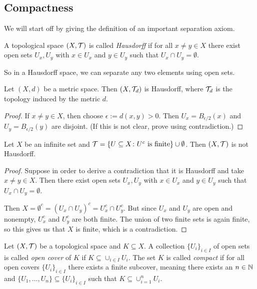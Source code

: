 \documentclass{article}
\begin{document}
\subsection{Compactness}

We will start off by giving the definition of an important separation axiom. 

\begin{definition}
A topological space $(X,\mathcal{T})$ is called \emph{Hausdorff} if for all $x\neq y\in X$ there exist open sets $U_x,U_y$ with $x\in U_x$ and $y\in U_y$ such that $U_x \cap U_y = \emptyset$.
\end{definition}

So in a Hausdorff space, we can separate any two elements using open sets.

\begin{example}
Let $(X,d)$ be a metric space. Then $(X,\mathcal{T}_d)$ is Hausdorff, where $\mathcal{T}_d$ is the topology induced by the metric $d$.
\end{example}
\begin{proof}
If $x\neq y \in X$, then choose $\epsilon:= d(x,y)>0$. Then $U_x=B_{\epsilon/2}(x)$ and $U_y=B_{\epsilon/2}(y)$ are disjoint. (If this is not clear, prove using contradiction.)
\end{proof}

\begin{example}
Let $X$ be an infinite set and $\mathcal{T} = \{U\subseteq X \colon U^c \text{ is finite} \}\cup \emptyset$. Then  $(X,\mathcal{T})$ is not Hausdorff.
\end{example}
\begin{proof}
Suppose in order to derive a contradiction that it is Hausdorff and take $x\neq y \in X$. Then there exist open sets $U_x,U_y$ with $x\in U_x$ and $y\in U_y$ such that $U_x \cap U_y = \emptyset$.

Then $X = \emptyset^c = (U_x \cap U_y)^c = U_x^c \cap U_y^c$. But since $U_x$ and $U_y$ are open and nonempty, $U_x^c$ and $U_y^c$ are both finite. The union of two finite sets is again finite, so this gives us that $X$ is finite, which is a contradiction.
\end{proof}


\begin{definition}[Compact]
Let $(X,\mathcal{T})$ be a topological space and $K\subseteq X$. A collection $\{U_i\}_{i\in I} $ of open sets is called \emph{open cover} of $K$ if $K\subseteq \cup_{i\in I} U_i$. The set $K$ is called \emph{compact} if for all open covers $\{U_i\}_{i\in I}$ there exists a finite subcover, meaning there exists an $n\in {\mathbb{N}}$ and $\{U_1,\ldots,U_n\}\subseteq \{U_i\}_{i\in I}$ such that $K\subseteq \cup_{i=1}^n U_i$.
\end{definition}
\end{document}
